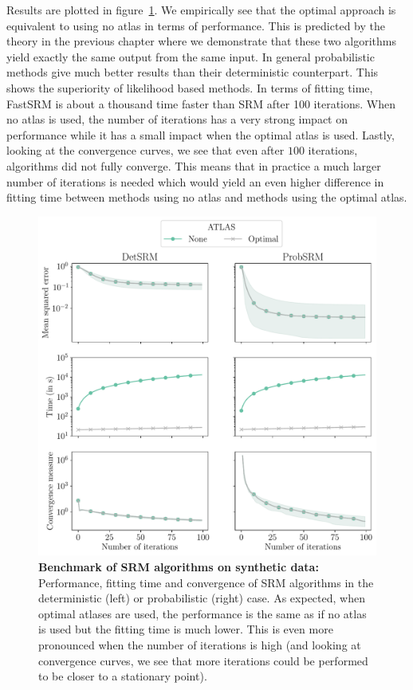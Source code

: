 Results are plotted in figure~\ref{fig:srm:synthetic_gradient}. 
We empirically see that the optimal approach is equivalent to using no atlas in
terms of performance. This is predicted by the theory in the previous chapter
where we demonstrate that these two algorithms yield exactly the same output from the same input.
In general probabilistic methods give much better results than their deterministic
counterpart. This shows the superiority of likelihood based methods.
In terms of fitting time, FastSRM is about a thousand time faster than SRM after
100 iterations. When no atlas is used, the number
of iterations has a very strong impact on performance while it has a small impact
when the optimal atlas is used. 
Lastly, looking at the convergence curves, we see that even after $100$ iterations, algorithms did
not fully converge. This means that in practice a much larger number of
iterations is needed which would yield an even higher difference in fitting time
between methods using no atlas and methods using the optimal atlas.

\begin{figure}
  \centering
  \includegraphics[width=\textwidth]{figures/srm/synthetic_gradient.pdf}
  \caption{\textbf{Benchmark of SRM algorithms on synthetic data: } Performance,
    fitting time and convergence of SRM algorithms in the deterministic (left)
    or probabilistic (right) case.  As expected, when optimal atlases are used,
    the performance is the same as if no atlas is used but the fitting time is
    much lower. This is even more pronounced when the number of iterations is
    high (and looking at convergence curves, we see that more iterations could
    be performed to be closer to a stationary point).}
  \label{fig:srm:synthetic_gradient}
\end{figure}

